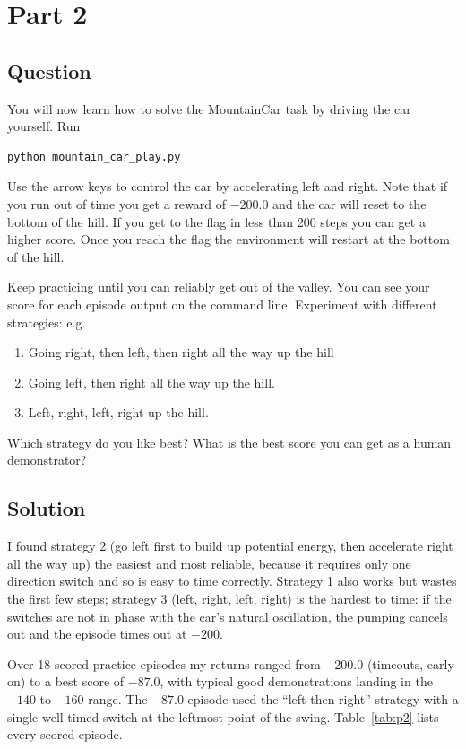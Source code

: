 \documentclass[12pt]{article}%
\begin{document}
\section{Part 2}

\subsection{Question}
You will now learn how to solve the MountainCar task by driving the car yourself.
Run
\begin{verbatim}
python mountain_car_play.py
\end{verbatim}
Use the arrow keys to control the car by accelerating left and right. Note that
if you run out of time you get a reward of $-200.0$ and the car will reset to the
bottom of the hill. If you get to the flag in less than 200 steps you can get a
higher score. Once you reach the flag the environment will restart at the bottom
of the hill.

Keep practicing until you can reliably get out of the valley. You can see your
score for each episode output on the command line.
Experiment with different strategies: e.g.
\begin{enumerate}
	\item Going right, then left, then right all the way up the hill
	\item Going left, then right all the way up the hill.
	\item Left, right, left, right up the hill.
\end{enumerate}
Which strategy do you like best? What is the best score you can get as a human
demonstrator?

\subsection{Solution}
I found strategy 2 (go left first to build up potential energy, then accelerate
right all the way up) the easiest and most reliable, because it requires only one
direction switch and so is easy to time correctly. Strategy 1 also works but wastes the
first few steps; strategy 3 (left, right, left, right) is the hardest to time: if the
switches are not in phase with the car's natural oscillation, the pumping cancels out and
the episode times out at $-200$.

Over 18 scored practice episodes my returns ranged from $-200.0$ (timeouts, early on)
to a best score of $\mathbf{-87.0}$, with typical good demonstrations landing in the
$-140$ to $-160$ range. The $-87.0$ episode used the ``left then right'' strategy with a
single well-timed switch at the leftmost point of the swing. Table~\ref{tab:p2} lists
every scored episode.
\end{document}
